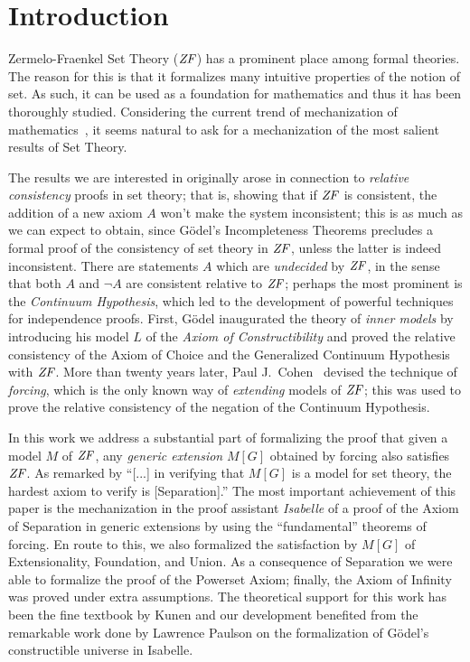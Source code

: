 \section{Introduction}
Zermelo-Fraenkel Set Theory ($\mathit{ZF}$) has a prominent place among formal
theories. The reason for this is that it formalizes many intuitive
properties of the notion of set. As such, it can be used as a
foundation for mathematics and thus it has been
thoroughly studied. 
Considering the current trend 
of mechanization of mathematics~\cite{avigad2018mechanization}, it
seems natural to ask for a mechanization of the most salient results
of Set Theory.

The results we are interested in originally arose in connection to
\emph{relative consistency} proofs in set theory; that is, showing
that if $\mathit{ZF}$ is 
consistent, the addition of a new axiom $A$ won't make the system
inconsistent; this is as much as we can expect to obtain, since
G\"odel's Incompleteness Theorems precludes a  
formal proof of the consistency of set theory in $\mathit{ZF}$, unless the
latter is indeed inconsistent. There are statements $A$ which are
\emph{undecided} by $\mathit{ZF}$, in the sense that both $A$ and $\neg A$ are
consistent relative to $\mathit{ZF}$; perhaps the most prominent  is the
\emph{Continuum Hypothesis}, which led to the development of powerful
techniques for independence proofs. First, G\"odel inaugurated the
theory of \emph{inner models} by introducing his model $L$ of
the \emph{Axiom of Constructibility} \cite{godel-L} and proved the
relative consistency of the Axiom of Choice and the Generalized
Continuum Hypothesis with $\mathit{ZF}$. More than twenty years later, Paul
J.~Cohen~\cite{Cohen-CH-PNAS} devised the technique of \emph{forcing},
which is the only known way of \emph{extending} models of $\mathit{ZF}$; this
was used to prove the relative consistency of the 
negation of the Continuum Hypothesis. 

In this work we address a substantial part of formalizing the proof
that given a model $M$ of $\mathit{ZF}$, any \emph{generic extension} $M[G]$
obtained by forcing also satisfies $\mathit{ZF}$. As remarked by
\citet[][p.250]{kunen2011set} \enquote{[...] in verifying that $M[G]$
  is a model for set theory, the hardest axiom to verify is
  [Separation].}  
The most important achievement of this paper is the
mechanization in the proof assistant \emph{Isabelle} of a proof of the
Axiom of Separation in 
generic extensions by using the ``fundamental'' theorems of forcing.
En route
to this, we also formalized the satisfaction by $M[G]$ of
Extensionality, Foundation, and Union. As a consequence of Separation
we were able to formalize the proof of the Powerset Axiom; finally,
the Axiom of Infinity was proved under extra assumptions. %
The theoretical support for this work has been 
the fine textbook by Kunen \cite{kunen2011set} and our development
benefited from the remarkable work done by Lawrence 
Paulson \cite{paulson_2003} on the formalization of G\"odel's
constructible universe in Isabelle. 

